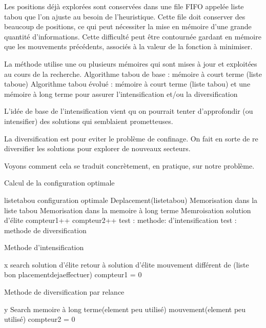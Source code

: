\documentclass{report}
\begin{document}
Les positions déjà explorées sont conservées dans une file FIFO appelée  liste tabou  que l'on ajuste au besoin de l'heuristique. Cette file doit conserver des beaucoup de positions, ce qui peut  nécessiter la mise en mémoire d'une grande quantité d'informations. Cette difficulté peut être contournée gardant en mémoire que les mouvements précédents, associés à la valeur de la fonction à minimiser.

La méthode utilise une ou plusieurs mémoires  qui sont mises à jour
et exploitées au cours de la recherche.
Algorithme tabou de base : mémoire à court terme (liste taboue)
Algorithme tabou évolué : mémoire à court terme (liste tabou) et une mémoire à
long terme pour assurer l’intensification et/ou la diversification

L'idée de base de l'intensification vient qu on pourrait tenter d'approfondir (ou intensifier) des solutions qui semblaient prometteuses.

La diversification est pour eviter le problème de confinage. On fait en sorte de re diversifier les solutions pour explorer de nouveaux secteurs.

Voyons comment cela se traduit concrètement, en pratique, sur notre problème.

\begin{algorithm}
\caption{Calcul de la configuration optimale}
\begin{algorithmic}
\REQUIRE listetabou
\ENSURE configuration optimale
\STATE Deplacement(listetabou)
\STATE Memorisation dans la liste tabou
\STATE Memorisation dans la memoire à long terme
\STATE Memroisation solution d'élite
\STATE compteur1++
\STATE compteur2++
\STATE test : methode: d'intensification
\STATE test : methode de diversification
\ENDWHILE
\end{algorithmic}
\end{algorithm}

\begin{algorithm}
\caption{Methode d'intensification}
\begin{algorithmic}
\REQUIRE x
\ENSURE 
{}
\STATE search solution d'élite
\STATE retour à solution d'élite
\STATE mouvement différent de (liste bon placementdejaeffectuer)
\STATE compteur1 = 0
\ENDIF
\end{algorithmic}
\end{algorithm}

\begin{algorithm}
\caption{Methode de diversification par relance}
\begin{algorithmic}
\REQUIRE y
\ENSURE 
{}
\STATE Search memoire à long terme(element peu utilisé)
\STATE mouvement(element peu utilisé)
\STATE compteur2 = 0
\ENDIF
\end{algorithmic}
\end{algorithm}
\end{document}
